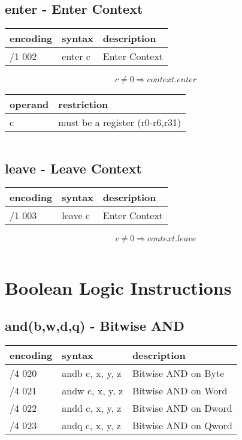 \documentclass[letterpaper,10pt,openright,twoside,onecolumn]{book}
\begin{document}
\subsection{enter - Enter Context}
  \begin{tabular}{|l|l|l|}
   \hline
    encoding & syntax & description \\
   \hline
    /1 002 & enter c & Enter Context \\
   \hline
  \end{tabular}

  \begin{displaymath} c \neq 0 \Rightarrow context.enter\end{displaymath}

  \flushleft
  \begin{tabular}{|l|l|}
   \hline
    operand & restriction \\
   \hline
    c & must be a register (r0-r6,r31) \\
   \hline
  \end{tabular}

  \begin{verbatim}
  \end{verbatim}
\subsection{leave - Leave Context}
  \begin{tabular}{|l|l|l|}
   \hline
    encoding & syntax & description \\
   \hline
    /1 003 & leave c & Enter Context \\
   \hline
  \end{tabular}

  \begin{displaymath} c \neq 0 \Rightarrow context.leave\end{displaymath}

  \begin{verbatim}
  \end{verbatim}

\clearpage\section{Boolean Logic Instructions}
\subsection{and(b,w,d,q) - Bitwise AND}
  \begin{tabular}{|l|l|l|}
   \hline
    encoding & syntax & description \\
   \hline
    /4 020 & andb c, x, y, z & Bitwise AND on Byte \\
    /4 021 & andw c, x, y, z & Bitwise AND on Word \\
    /4 022 & andd c, x, y, z & Bitwise AND on Dword \\
    /4 023 & andq c, x, y, z & Bitwise AND on Qword \\
   \hline
  \end{tabular}
\end{document}

